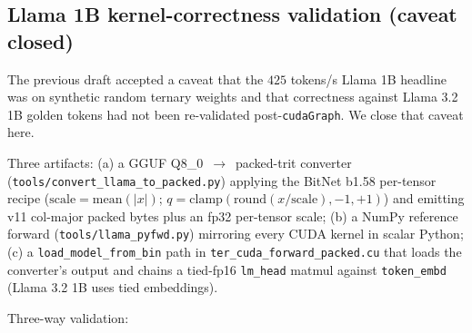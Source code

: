 \documentclass{article}
\begin{document}
\subsection{Llama 1B kernel-correctness validation (caveat closed)}
\label{sec:llama-validation}

The previous draft accepted a caveat that the $425$ tokens/s Llama 1B
headline was on synthetic random ternary weights and that
correctness against Llama 3.2 1B golden tokens had not been
re-validated post-\texttt{cudaGraph}. We close that caveat here.

Three artifacts: (a) a {GGUF} {Q8\_0}~$\rightarrow$~packed-trit
converter (\texttt{tools/convert\_llama\_to\_packed.py}) applying the
BitNet b1.58 per-tensor recipe ($\mathrm{scale} = \mathrm{mean}(|x|)$;
$q = \mathrm{clamp}(\mathrm{round}(x/\mathrm{scale}), -1, +1)$) and
emitting v11 col-major packed bytes plus an {fp32} per-tensor scale;
(b) a NumPy reference forward
(\texttt{tools/llama\_pyfwd.py}) mirroring every {CUDA} kernel
in scalar Python; (c) a \texttt{load\_model\_from\_bin} path in
\texttt{ter\_cuda\_forward\_packed.cu} that loads the converter's
output and chains a tied-fp16 \texttt{lm\_head} matmul against
\texttt{token\_embd} (Llama 3.2 1B uses tied embeddings).

Three-way validation:
\end{document}
